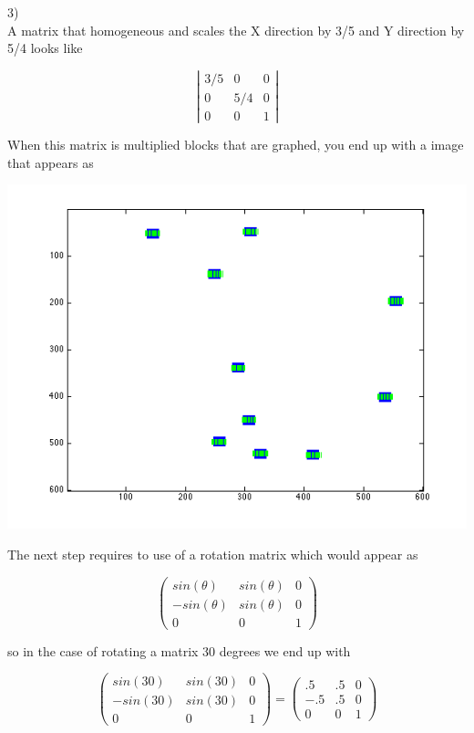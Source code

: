 \documentclass[a4paper,12pt]{article}
\begin{document}
3)\\
A matrix that homogeneous and scales the X direction by 3/5 and Y direction by 5/4 looks like

\[ \left | \begin{array}{ccc}
3/5 & 0 & 0 \\
0 & 5/4 & 0 \\
0 & 0 & 1 \end{array} \right | \]

When this matrix is multiplied blocks that are graphed, you end up with a image that appears as

\includegraphics[scale=.5]{q3_1.png}

The next step requires to use of a rotation matrix which would appear as

\[ \left ( \begin{array}{ccc}
sin(\theta) & sin(\theta) & 0 \\
-sin(\theta) & sin(\theta) & 0\\
0 & 0 & 1 \end{array} \right ) \]

so in the case of rotating a matrix 30 degrees we end up with

\[ \left ( \begin{array}{ccc}
sin(30) & sin(30) & 0\\
-sin(30) & sin(30) & 0 \\
0 & 0 & 1 \end{array} \right ) 
 = 
 \left (\begin{array}{ccc}
 .5 & .5 & 0\\
 -.5 & .5 & 0\\
 0 & 0 & 1 \end{array} \right ) \]
 
\end{document}
